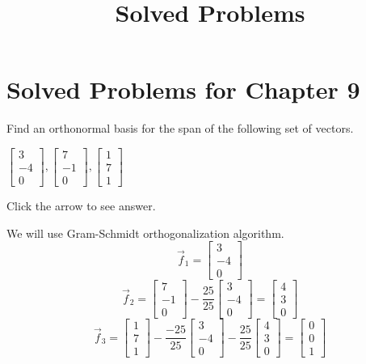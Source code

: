 \documentclass{ximera}
\title{Solved Problems} \license{CC BY-NC-SA 4.0}
\begin{document}
\begin{abstract}
\end{abstract}
\maketitle

\section*{Solved Problems for Chapter 9}

\begin{problem}\label{prob:orth_basis1}
    Find an orthonormal basis for the span of the following set of
vectors.


$\left[
\begin{array}{r}
 3 \\
-4 \\
0
\end{array}
\right] ,\left[
\begin{array}{r}
 7 \\
-1 \\
0
\end{array}
\right] ,\left[
\begin{array}{r}
 1 \\
7 \\
1
\end{array}
\right] $

Click the arrow to see answer.
\begin{expandable}
We will use Gram-Schmidt orthogonalization algorithm.
$$\vec{f}_1=\begin{bmatrix}3\\-4\\0\end{bmatrix}$$
$$\vec{f}_2=\begin{bmatrix}7\\-1\\0\end{bmatrix}-\frac{25}{25}\begin{bmatrix}3\\-4\\0\end{bmatrix}=\begin{bmatrix}4\\3\\0\end{bmatrix}$$
$$\vec{f}_3=\begin{bmatrix}1\\7\\1\end{bmatrix}-\frac{-25}{25}\begin{bmatrix}3\\-4\\0\end{bmatrix}-\frac{25}{25}\begin{bmatrix}4\\3\\0\end{bmatrix}=\begin{bmatrix}0\\0\\1\end{bmatrix}$$


\end{expandable}
\end{problem}
\end{document}
